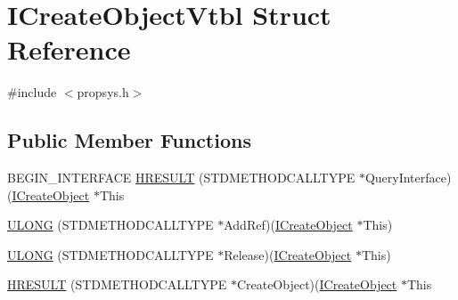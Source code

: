 \hypertarget{struct_i_create_object_vtbl}{}\section{I\+Create\+Object\+Vtbl Struct Reference}
\label{struct_i_create_object_vtbl}


{\ttfamily \#include $<$propsys.\+h$>$}

\subsection*{Public Member Functions}
\begin{DoxyCompactItemize}
\item 
B\+E\+G\+I\+N\+\_\+\+I\+N\+T\+E\+R\+F\+A\+CE \hyperlink{struct_i_create_object_vtbl_a99096c8221ef1bf09b08e42c676448fa}{H\+R\+E\+S\+U\+LT} (S\+T\+D\+M\+E\+T\+H\+O\+D\+C\+A\+L\+L\+T\+Y\+PE $\ast$Query\+Interface)(\hyperlink{propsys_8h_ac9ac14e7b529d4309477e41fa68ae164}{I\+Create\+Object} $\ast$This
\item 
\hyperlink{struct_i_create_object_vtbl_a18db87bee99fca7e69205fc0c5e7aefc}{U\+L\+O\+NG} (S\+T\+D\+M\+E\+T\+H\+O\+D\+C\+A\+L\+L\+T\+Y\+PE $\ast$Add\+Ref)(\hyperlink{propsys_8h_ac9ac14e7b529d4309477e41fa68ae164}{I\+Create\+Object} $\ast$This)
\item 
\hyperlink{struct_i_create_object_vtbl_a955f050395437d32e55de7ab9b4fba3a}{U\+L\+O\+NG} (S\+T\+D\+M\+E\+T\+H\+O\+D\+C\+A\+L\+L\+T\+Y\+PE $\ast$Release)(\hyperlink{propsys_8h_ac9ac14e7b529d4309477e41fa68ae164}{I\+Create\+Object} $\ast$This)
\item 
\hyperlink{struct_i_create_object_vtbl_abe2a064b70530cd26f83e73e67a6952a}{H\+R\+E\+S\+U\+LT} (S\+T\+D\+M\+E\+T\+H\+O\+D\+C\+A\+L\+L\+T\+Y\+PE $\ast$Create\+Object)(\hyperlink{propsys_8h_ac9ac14e7b529d4309477e41fa68ae164}{I\+Create\+Object} $\ast$This
\end{DoxyCompactItemize}
